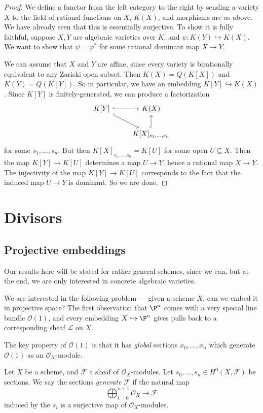 \documentclass[a4paper]{article}
\begin{document}
\begin{proof}
  We define a functor from the left category to the right by sending a variety $X$ to the field of rational functions on $X$, $K(X)$, and morphisms are as above. We have already seen that this is essentially surjective. To show it is fully faithful, suppose $X, Y$ are algebraic varieties over $K$, and $\psi: K(Y) \hookrightarrow K(X)$. We want to show that $\psi = \varphi^*$ for some rational dominant map $X \to Y$.

  We can assume that $X$ and $Y$ are affine, since every variety is birationally equivalent to any Zariski open subset. Then $K(X) = Q(K[X])$ and $K(Y) = Q(K[Y])$. So in particular, we have an embedding $K[Y] \hookrightarrow K(X)$. Since $K[Y]$ is finitely-generated, we can produce a factorization
  \[
    \begin{tikzcd}
      K[Y] \ar[r, hook] \ar[dr, hook] & K(X) \\
      & K[X]_{s_1, \ldots, s_n} \ar[u, hook]
    \end{tikzcd}
  \]
  for some $s_1, \ldots, s_n$. But then $K[X]_{s_1, \ldots, s_n} = K[U]$ for some open $U \subseteq X$. Then the map $K[Y] \to K[U]$ determines a map $U \to Y$, hence a rational map $X \to Y$. The injectivity of the map $K[Y] \to K[U]$ corresponds to the fact that the induced map $U \to Y$ is dominant. So we are done.
\end{proof}

\section{Divisors}
\subsection{Projective embeddings}
Our results here will be stated for rather general schemes, since we can, but at the end, we are only interested in concrete algebraic varieties.

We are interested in the following problem --- given a scheme $X$, can we embed it in projective space? The first observation that $\P^n$ comes with a very special line bundle $\mathcal{O}(1)$, and every embedding $X \hookrightarrow \P^n$ gives pulls back to a corresponding sheaf $\mathcal{L}$ on $X$.

The key property of $\mathcal{O}(1)$ is that it has \emph{global} sections $x_0, \ldots, x_n$ which generate $\mathcal{O}(1)$ as an $\mathcal{O}_X$-module.

\begin{defi}
  Let $X$ be a scheme, and $\mathcal{F}$ a sheaf of $\mathcal{O}_X$-modules. Let $s_0, \ldots, s_n \in H^0(X, \mathcal{F})$ be sections. We say the sections \emph{generate} $\mathcal{F}$ if the natural map
  \[
    \bigoplus_{i = 0}^{n + 1} \mathcal{O}_X \to \mathcal{F}
  \]
  induced by the $s_i$ is a surjective map of $\mathcal{O}_X$-modules.
\end{defi}
\end{document}
